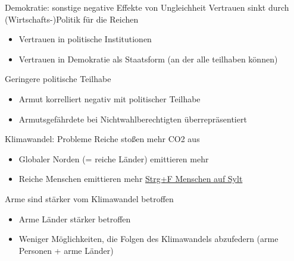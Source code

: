 \documentclass[aspectratio=169,xcolor=dvipsnames]{beamer}
\begin{document}
\begin{frame}[label = demokratie_teilhabe]{Demokratie: sonstige negative Effekte von Ungleichheit}
    Vertrauen sinkt durch (Wirtschafts-)Politik für die Reichen
    \begin{itemize}
        \item Vertrauen in politische Institutionen
        \item Vertrauen in Demokratie als Staatsform (an der alle teilhaben können)
    \end{itemize}

    \pause
    \vspace{0.5cm}
    Geringere politische Teilhabe
    \begin{itemize}
        \item Armut korrelliert negativ mit politischer Teilhabe
        \item Armutsgefährdete bei Nichtwahlberechtigten überrepräsentiert \hyperlink{nichtwahlberechtigte}{}
    \end{itemize}
\end{frame}

\begin{frame}[label = klimawandel]{Klimawandel: Probleme}
    Reiche stoßen mehr CO2 aus
    \begin{itemize}
        \item Globaler Norden (= reiche Länder) emittieren mehr \hyperlink{percapita_gdp-co2}{}
        \item Reiche Menschen emittieren mehr \hyperlink{co2-einkommensverteilung}{} {\scriptsize \href{https://de.linkedin.com/posts/marko-kovic_ein-mann-der-soeben-mit-einem-privatjet-activity-7084645559055069184-4y1S}{Strg+F Menschen auf Sylt}}
    \end{itemize}

    \vspace{0.5cm}
    \pause
    Arme sind stärker vom Klimawandel betroffen
    \begin{itemize}
        \item Arme Länder stärker betroffen \hyperlink{climate-risk}{}
        \item Weniger Möglichkeiten, die Folgen des Klimawandels abzufedern (arme Personen + arme Länder)
    \end{itemize}

    \vspace{0.5cm}
    \hyperlink{memes-klimawandel}{}
\end{frame}
\end{document}
